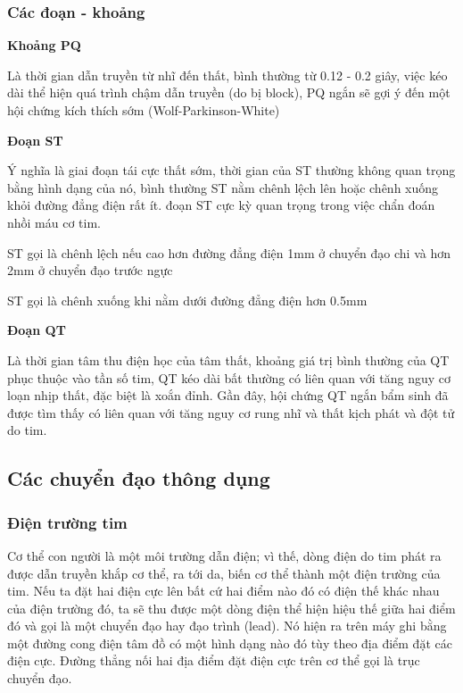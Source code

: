 \subsubsection{Các đoạn - khoảng}
\textbf{Khoảng PQ}

Là thời gian dẫn truyền từ nhĩ đến thất, bình thường từ 0.12 - 0.2 giây, việc kéo dài thể hiện quá trình chậm dẫn truyền (do bị block), PQ ngắn sẽ gợi ý đến một hội chứng kích thích sớm (Wolf-Parkinson-White)

\textbf{Đoạn ST}

Ý nghĩa là giai đoạn tái cực thất sớm, thời gian của ST thường không quan trọng bằng hình dạng của nó, bình thường ST nằm chênh lệch lên hoặc chênh xuống khỏi đường đẳng điện rất ít. đoạn ST cực kỳ quan trọng trong việc chẩn đoán nhồi máu cơ tim.

ST gọi là chênh lệch nếu cao hơn đường đẳng điện 1mm ở chuyển đạo chi và hơn 2mm ở chuyển đạo trước ngực

ST gọi là chênh xuống khi nằm dưới đường đẳng điện hơn 0.5mm

\textbf{Đoạn QT}

Là thời gian tâm thu điện học của tâm thất, khoảng giá trị bình thường của QT phục thuộc vào tần số tim, QT kéo dài bất thường có liên quan với tăng nguy cơ loạn nhịp thất, đặc biệt là xoắn đỉnh. Gần đây, hội chứng QT ngắn bẩm sinh đã được tìm thấy có liên quan với tăng nguy cơ rung nhĩ và thất kịch phát và đột tử do tim.

\subsection{Các chuyển đạo thông dụng}

\subsubsection{Điện trường tim}
Cơ thể con người là một môi trường dẫn điện; vì thế, dòng điện do tim phát ra được dẫn truyền khắp cơ thể, ra tới da, biến cơ thể thành một điện trường của tim. Nếu ta đặt hai điện cực lên bất cứ hai điểm nào đó có điện thế khác nhau của điện trường đó, ta sẽ thu được một dòng điện thể hiện hiệu thế giữa hai điểm đó và gọi là một chuyển đạo hay đạo trình (lead). Nó hiện ra trên máy ghi bằng một đường cong điện tâm đồ có một hình dạng nào đó tùy theo địa điểm đặt các điện cực. Đường thẳng nối hai địa điểm đặt điện cực trên cơ thể gọi là trục chuyển đạo.

